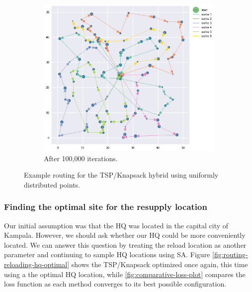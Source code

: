 \documentclass{article} %
\begin{document}
\begin{figure}[h]
\begin{subfigure}[b]{0.5\textwidth}
  \end{subfigure}
  \begin{subfigure}[b]{\textwidth}
    \centering
    \includegraphics[width=\textwidth]{figures/sorties-100000}
    \caption{After 100,000 iterations.}
  \end{subfigure}
  \caption{Example routing for the TSP/Knapsack hybrid using uniformly distributed points.}
  \label{fig:sorties}
\end{figure}

\subsubsection{Finding the optimal site for the resupply location}

Our initial assumption was that the HQ was located in the capital city of Kampala. However, we should ask whether our HQ could be more conveniently located. We can answer this question by treating the reload location as another parameter and continuing to sample HQ locations using SA. Figure \ref{fig:routing-reloading-hq-optimal} shows the TSP/Knapsack optimized once again, this time using a the optimal HQ location, while \ref{fig:comparative-loss-plot} compares the loss function as each method converges to its best possible configuration.
\end{document}
